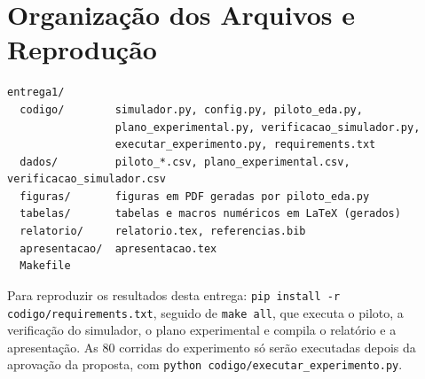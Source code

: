 \documentclass[stu,a4paper,12pt,floatsintext,biblatex]{apa7}
\begin{document}
\section{Organização dos Arquivos e Reprodução}
\begin{verbatim}
entrega1/
  codigo/        simulador.py, config.py, piloto_eda.py,
                 plano_experimental.py, verificacao_simulador.py,
                 executar_experimento.py, requirements.txt
  dados/         piloto_*.csv, plano_experimental.csv, verificacao_simulador.csv
  figuras/       figuras em PDF geradas por piloto_eda.py
  tabelas/       tabelas e macros numéricos em LaTeX (gerados)
  relatorio/     relatorio.tex, referencias.bib
  apresentacao/  apresentacao.tex
  Makefile
\end{verbatim}

Para reproduzir os resultados desta entrega: \texttt{pip install -r codigo/requirements.txt}, seguido de \texttt{make all}, que executa o piloto, a verificação do simulador, o plano experimental e compila o relatório e a apresentação.
As 80 corridas do experimento só serão executadas depois da aprovação da proposta, com \texttt{python codigo/executar\_experimento.py}.
\end{document}
